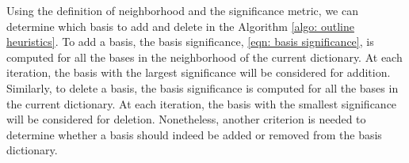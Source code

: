 Using the definition of neighborhood and the significance metric, we can determine which basis
to add and delete in the Algorithm \ref{algo: outline heuristics}. 
To add a basis, the basis significance, \eqref{eqn: basis significance},
is computed for all the bases in the neighborhood of the current dictionary. At each iteration,
the basis with the largest significance will be considered for addition. Similarly, 
to delete a basis, the basis significance is computed for all the bases in the current dictionary.
At each iteration, the basis with the smallest significance will be considered for deletion.
Nonetheless, another criterion is needed to determine whether a basis should indeed
be added or removed from the basis dictionary. \\

